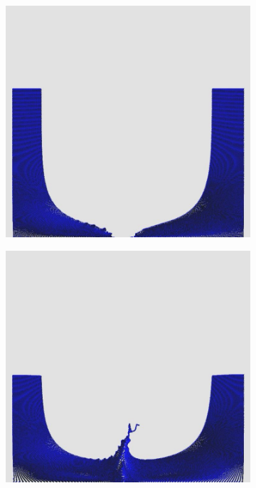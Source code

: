 \documentclass[12pt,a4paper,dvipsnames]{article}
\begin{document}
\begin{figure}[!ht]
\begin{subfigure}[!h]{0.3\textwidth}
	\end{subfigure}
	\begin{subfigure}[!h]{0.3\textwidth} \centering
		\includegraphics[width=\textwidth]{DDB/DDB-02.jpg}
	\end{subfigure}
	\begin{subfigure}[!h]{0.3\textwidth} \centering
		\includegraphics[width=\textwidth]{DDB/DDB-03.jpg}

\end{subfigure}
\end{figure}
\end{document}
